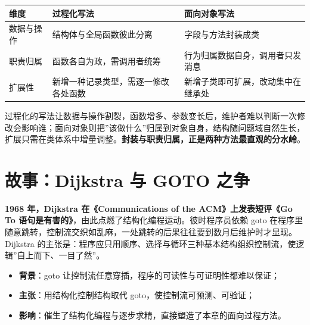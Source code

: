 \documentclass[12pt,a4paper,twoside,openany]{ctexbook}
\numberwithin{figure}{chapter}
\numberwithin{table}{chapter}
\providecommand{\tightlist}{\setlength{\itemsep}{0pt}\setlength{\parskip}{0pt}}
\newcounter{none}
\begin{document}
{\def\LTcaptype{none} %
\begin{longtable}[]{@{}
  >{\raggedright\arraybackslash}p{}
  >{\raggedright\arraybackslash}p{}
  >{\raggedright\arraybackslash}p{}@{}}
\toprule\noalign{}
\begin{minipage}[b]{\linewidth}\raggedright
维度
\end{minipage} & \begin{minipage}[b]{\linewidth}\raggedright
过程化写法
\end{minipage} & \begin{minipage}[b]{\linewidth}\raggedright
面向对象写法
\end{minipage} \\
\midrule\noalign{}
\endhead
\bottomrule\noalign{}
\endlastfoot
数据与操作 & 结构体与全局函数彼此分离 & 字段与方法封装成类 \\
职责归属 & 函数各自为政，需调用者统筹 &
行为归属数据自身，调用者只发消息 \\
扩展性 & 新增一种记录类型，需逐一修改各处函数 &
新增子类即可扩展，改动集中在继承处 \\
\end{longtable}
}

过程化的写法让数据与操作割裂，函数增多、参数变长后，维护者难以判断一次修改会影响谁；面向对象则把''该做什么''归属到对象自身，结构随问题域自然生长，扩展只需在类体系中增量调整。\textbf{封装与职责归属，正是两种方法最直观的分水岭}。

\section{故事：Dijkstra 与 GOTO
之争}\label{ux6545ux4e8bdijkstra-ux4e0e-goto-ux4e4bux4e89}

\textbf{1968 年，Dijkstra 在《Communications of the ACM》上发表短评《Go
To 语句是有害的》}，由此点燃了结构化编程运动。彼时程序员依赖 goto
在程序里随意跳转，控制流交织如乱麻，一处跳转的后果往往要到数月后维护时才显现。Dijkstra
的主张是：程序应只用顺序、选择与循环三种基本结构组织控制流，使逻辑''自上而下、一目了然''。

\begin{itemize}
\tightlist
\item
  \textbf{背景}：goto
  让控制流任意穿插，程序的可读性与可证明性都难以保证；
\item
  \textbf{主张}：用结构化控制结构取代 goto，使控制流可预测、可验证；
\item
  \textbf{影响}：催生了结构化编程与逐步求精，直接塑造了本章的面向过程方法。
\end{itemize}
\end{document}
